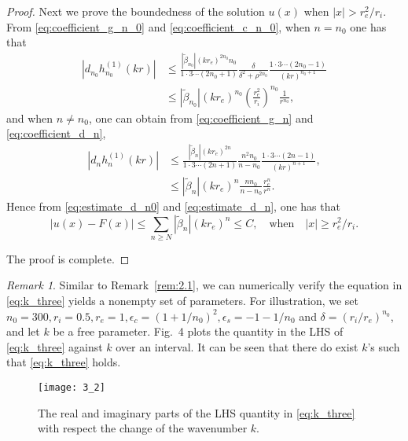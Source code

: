 \documentclass[11pt,reqno,twoside]{amsart}
\theoremstyle{definition}
\theoremstyle{remark}
\newtheorem{rem}{Remark}[section]
\numberwithin{equation}{section}
\begin{document}
\begin{proof}
Next we prove the boundedness of the solution $u(x)$ when $|x|>r_e^2/r_i$. From \eqref{eq:coefficient_g_n_0} and \eqref{eq:coefficient_c_n_0}, when $n=n_0$ one has that
\begin{equation}\label{eq:estimate_d_n0}
 \begin{split}
   |d_{n_0}h_{n_0}^{(1)}(kr)| & \leq \frac{|\tilde{\beta}_{n_0}| (kr_e)^{2n_0}n_0}{1\cdot 3 \cdots (2n_0+1)}\frac{\delta}{\delta^2+\rho^{2n_0}}\frac{1\cdot 3 \cdots (2n_0-1)}{(kr)^{n_0+1}} \\
     & \leq |\tilde{\beta}_{n_0}|(kr_e)^{n_0} \left(\frac{r_e^2}{r_i}\right)^{n_0}\frac{1}{r^{n_0}} ,
 \end{split}
\end{equation}
and when $n\neq n_0$, one can obtain from \eqref{eq:coefficient_g_n} and \eqref{eq:coefficient_d_n},
\begin{equation}\label{eq:estimate_d_n}
 \begin{split}
   |d_n h_{n}^{(1)}(kr)| & \leq  \frac{|\tilde{\beta}_n| (kr_e)^{2n}}{1\cdot 3 \cdots (2n+1)}  \frac{n^2n_0}{n-n_0} \frac{1\cdot 3 \cdots (2n-1)}{(kr)^{n+1}},\\
     & \leq |\tilde{\beta}_{n}|(kr_e)^{n} \frac{nn_0}{n-n_0}\frac{r_e^n }{r^n}.
 \end{split}
\end{equation}
Hence from \eqref{eq:estimate_d_n0} and \eqref{eq:estimate_d_n}, one has that
\begin{equation}
  |u(x)-F(x)|\leq \sum_{n\geq N} |\tilde{\beta}_{n}|(kr_e)^{n}\leq C, \quad \mbox{when} \quad |x|\geq r_e^2/r_i.
\end{equation}

The proof is complete.
\end{proof}

\begin{rem}
Similar to Remark~\ref{rem:2.1}, we can numerically verify the equation in \eqref{eq:k_three} yields a nonempty set of parameters. For illustration, we set  $n_0=300, r_i=0.5, r_e=1, \epsilon_c=(1+1/n_0)^2, \epsilon_s=-1-1/n_0$ and $\delta=(r_i/r_e)^{n_0}$, and let $k$ be a free parameter. Fig.~4 plots the quantity in the LHS of \eqref{eq:k_three} against $k$ over an interval. It can be seen that there do exist $k$'s such that \eqref{eq:k_three} holds. 
\end{rem}
\begin{figure}[t]
  \centering
 {\texttt{[image: 3\_2]}}
  \caption{The real and imaginary parts of the LHS quantity in \eqref{eq:k_three} with respect the change of the wavenumber $k$. }
  \label{fig:4}
\end{figure}
\end{document}
